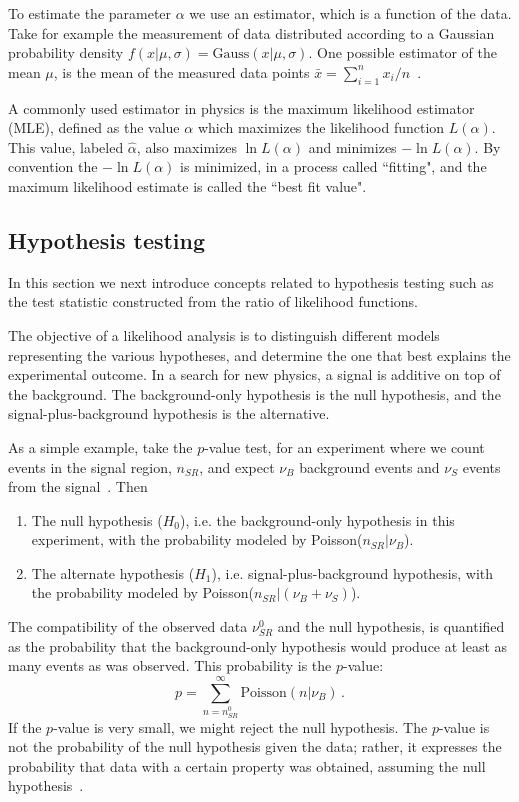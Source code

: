 To estimate the parameter $\alpha$ we use an estimator, which is a function of the data. Take for example the measurement of data distributed according to a Gaussian probability density $f(x| \mu,\sigma) = \text{Gauss}(x|\mu,\sigma)$. One possible estimator of the mean $\mu$, is the mean of the measured data points $\bar{x} = \sum_{i = 1}^{n} x_i / n$~\cite{2011-Statistics-Cranmer}. 

A commonly used estimator in physics is the maximum likelihood estimator (MLE), defined as the value $\alpha$ which maximizes the likelihood function $L(\alpha)$. This value, labeled $\hat{\alpha}$, also maximizes $\ln L(\alpha)$ and minimizes $-\ln L(\alpha)$. By convention the $-\ln L(\alpha)$ is minimized, in a process called ``fitting", and the maximum likelihood estimate is called the ``best fit value". 





\subsection{Hypothesis testing}
In this section we next introduce concepts related to hypothesis testing such as the test statistic constructed from the ratio of likelihood functions.

The objective of a likelihood analysis is to distinguish different models representing the various hypotheses, and determine the one that best explains the experimental outcome. In a search for new physics, a signal is additive on top of the background. The background-only hypothesis is the null hypothesis, and the signal-plus-background hypothesis is the alternative. 

As a simple example, take the $p$-value test, for an experiment where we count events in the signal region, $n_{SR}$, and expect $\nu_B$ background events and $\nu_S$ events from the signal~\cite{2011-Statistics-Cranmer}. Then 
\begin{enumerate}
    \item The null hypothesis ($H_0$), i.e. the background-only hypothesis in this experiment, with the probability modeled by Poisson($n_{SR}|\nu_B$).
    \item The alternate hypothesis ($H_1$), i.e. signal-plus-background hypothesis, with the probability modeled by Poisson($n_{SR}|(\nu_B + \nu_S)$).
\end{enumerate}
The compatibility of the observed data $\nu^0_{SR}$ and the null hypothesis, is quantified as the probability that the background-only hypothesis would produce at least as many events as was observed. This probability is the $p$-value: 
\begin{equation}
    p = \sum_{n = n^0_{SR}}^{\infty} \text{Poisson}(n | \nu_B) \, .
\end{equation}
If the $p$-value is very small, we might reject the null hypothesis. The $p$-value is not the probability of the null hypothesis given the data; rather, it expresses the probability that data with a certain property was obtained, assuming the null hypothesis~\cite{2011-Statistics-Cranmer}.

